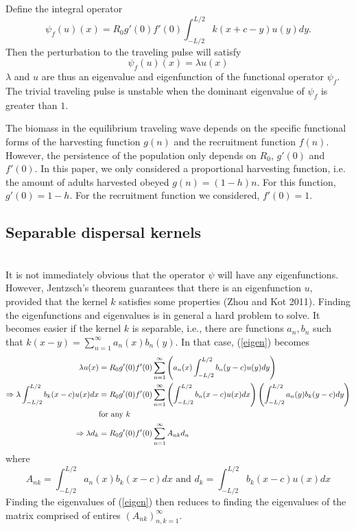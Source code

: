 \documentclass[12pt,english]{article}
\begin{document}
Define the integral operator
$$ \psi_f(u)(x)=R_0g'(0)f'(0)\int_{-L/2}^{L/2}k(x+c-y)u(y)dy. $$
Then the perturbation to the traveling pulse will satisfy 
\begin{equation} \psi_f(u)(x)=\lambda u(x) \label{eigen} \end{equation}
$\lambda$ and $u$ are thus an eigenvalue and eigenfunction of the functional operator $\psi_f$.  The trivial traveling pulse is unstable when the dominant eigenvalue of $\psi_f$ is greater than $1$.


The biomass in the equilibrium traveling wave depends on the specific functional forms of the harvesting function $g(n)$ and the recruitment function $f(n)$.  However, the persistence of the population only depends on $R_0$, $g'(0)$ and $f'(0)$. In this paper, we only considered a proportional harvesting function, i.e. the amount of adults harvested obeyed $g(n)=(1-h)n$.  For this function, $g'(0)=1-h$.  For the recruitment function we considered, $f'(0)=1$.

\subsection{Separable dispersal kernels \label{sep}}
~\\It is not immediately obvious that the operator $\psi$ will have any eigenfunctions.  However, Jentzsch's theorem guarantees that there is an eigenfunction $u$, provided that the kernel $k$ satisfies some properties (Zhou and Kot 2011).  Finding the eigenfunctions and eigenvalues is in general a hard problem to solve.  It becomes easier if the kernel $k$ is separable, i.e., there are functions $a_n,b_n$ such that $k(x-y)=\sum_{n=1}^\infty a_n(x)b_n(y)$.  In that case, (\ref{eigen}) becomes
\begin{align}
\lambda u(x)&=R_0g'(0)f'(0)\sum_{n=1}^\infty\left( a_n(x)\int_{-L/2}^{L/2}b_n(y-c)u(y)dy\right) \notag
\\ \Rightarrow \lambda\int_{-L/2}^{L/2}b_k(x-c)u(x)dx&=R_0g'(0)f'(0)\sum_{n=1}^{\infty}\left(\int_{-L/2}^{L/2}b_n(x-c)u(x)dx\right)\left(\int_{-L/2}^{L/2}a_n(y)b_k(y-c)dy\right) \notag
\\& \text{for any $k$} \notag
\\ \Rightarrow \lambda d_k&=R_0g'(0)f'(0)\sum_{n=1}^\infty A_{nk}d_n  \label{problem}
\end{align}
where
\begin{equation*}
A_{nk}=\int_{-L/2}^{L/2}a_n(x)b_k(x-c)dx \text{ and } d_k=\int_{-L/2}^{L/2}b_k(x-c)u(x)dx
\end{equation*}
Finding the eigenvalues of (\ref{eigen}) then reduces to finding the eigenvalues of the matrix comprised of entires $(A_{nk})_{n,k=1}^\infty$.
\end{document}
